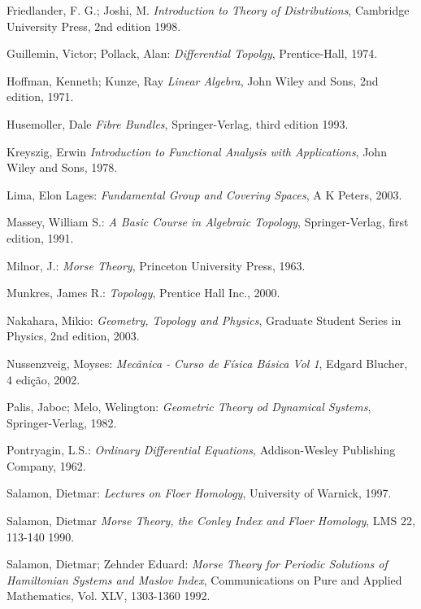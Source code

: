 \documentclass[12pt]{book}
\begin{document}
\begin{thebibliography}{9}
		Friedlander, F. G.; Joshi, M.
		\emph{Introduction to Theory of Distributions},
		Cambridge University Press, 2nd edition
		1998.
		
		Guillemin, Victor; Pollack, Alan:
		\emph{Differential Topolgy},
		Prentice-Hall,
		1974.	
		
		Hoffman, Kenneth; Kunze, Ray
		\emph{Linear Algebra},
		John Wiley and Sons, 2nd edition, 1971.
		
		Husemoller, Dale
		\emph{Fibre Bundles},
		Springer-Verlag, third edition
		1993.
		
		Kreyszig, Erwin
		\emph{Introduction to Functional Analysis with Applications},
		John Wiley and Sons, 1978.
		
		
		Lima, Elon Lages:
		\emph{Fundamental Group and Covering Spaces},
		A K Peters, 2003.
		
		Massey, William S.:
		\emph{A Basic Course in Algebraic Topology},
		Springer-Verlag, first edition,
		1991.
		
		Milnor, J.:
		\emph{Morse Theory},
		Princeton University Press, 1963.

		Munkres, James R.:
		\emph{Topology},
		Prentice Hall Inc., 2000.
				
		Nakahara, Mikio:
		\emph{Geometry, Topology and Physics},
		Graduate Student Series in Physics, 2nd edition,
		2003.
		
		Nussenzveig, Moyses:
		\emph{Mecânica - Curso de Física Básica Vol 1},
		Edgard Blucher, 4 edição,
		2002.
		
		Palis, Jaboc; Melo, Welington:
		\emph{Geometric Theory od Dynamical Systems},
		Springer-Verlag,
		1982.
		
		Pontryagin, L.S.:
		\emph{Ordinary Differential Equations},
		Addison-Wesley Publishing Company,
		1962.
		
		Salamon, Dietmar:
		\emph{Lectures on Floer Homology},
		University of Warnick,
		1997.


		Salamon, Dietmar
		\emph{Morse Theory, the Conley Index and Floer Homology},
		LMS 22, 113-140
		1990.

		Salamon, Dietmar; Zehnder Eduard:
		\emph{Morse Theory for Periodic Solutions of Hamiltonian Systems and Maslov Index},
		Communications on Pure and Applied Mathematics, Vol. XLV, 1303-1360
		1992.
		

\end{thebibliography}
\end{document}
